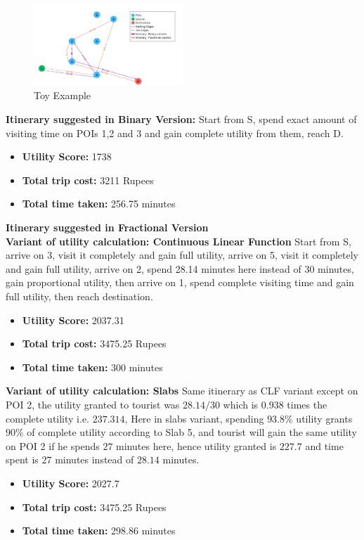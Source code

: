 \begin{figure}[H]
\centering
\includegraphics[width=0.5\textwidth]{toy.png}
\caption{Toy Example}
\label{fig:sample_image}
\end{figure}

\noindent \textbf{Itinerary suggested in Binary Version:}
Start from S, spend exact amount of visiting time on POIs 1,2 and 3 and gain complete utility from them, reach D.
\begin{itemize}
    \item \textbf{Utility Score:} 1738
    \item \textbf{Total trip cost:} 3211 Rupees
    \item \textbf{Total time taken:} 256.75 minutes
\end{itemize}

\noindent \textbf{Itinerary suggested in Fractional Version}\\
\textbf{Variant of utility calculation: Continuous Linear Function}
Start from S, arrive on 3, visit it completely and gain full utility, arrive on 5, visit it completely and gain full utility, arrive on 2, spend 28.14 minutes here instead of 30 minutes, gain proportional utility, then arrive on 1, spend complete visiting time and gain full utility, then reach destination.
\begin{itemize}
    \item \textbf{Utility Score:} 2037.31
    \item \textbf{Total trip cost:} 3475.25 Rupees
    \item \textbf{Total time taken:} 300 minutes
\end{itemize}

\noindent \textbf{Variant of utility calculation: Slabs}
Same itinerary as CLF variant except on POI 2, the utility granted to tourist was $28.14/30$
which is $0.938$ times the complete utility i.e. $237.314$, Here in slabs variant, spending $93.8\%$ utility grants $90\%$ of complete utility according to Slab 5, and tourist will gain the same utility on POI 2 if he spends $27$ minutes here, hence utility granted is $227.7$ and time spent is $27$ minutes instead of $28.14$ minutes.
\begin{itemize}
    \item \textbf{Utility Score:} 2027.7
    \item \textbf{Total trip cost:} 3475.25 Rupees
    \item \textbf{Total time taken:} 298.86 minutes
\end{itemize}

